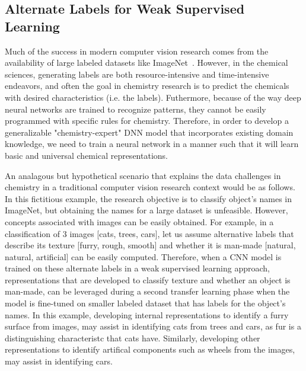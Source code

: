 \documentclass[sigconf]{acmart}
\begin{document}
\subsection{Alternate Labels for Weak Supervised Learning}
Much of the success in modern computer vision research comes from the availability of large labeled datasets like ImageNet~\cite{russakovsky2015}. However, in the chemical sciences, generating labels are both resource-intensive and time-intensive endeavors, and often the goal in chemistry research is to predict the chemicals with desired characteristics (i.e. the labels). Futhermore, because of the way deep neural networks are trained to recognize patterns, they cannot be easily programmed with specific rules for chemistry. Therefore, in order to develop a generalizable "chemistry-expert" DNN model that incorporates existing domain knowledge, we need to train a neural network in a manner such that it will learn basic and universal chemical representations. 

An analagous but hypothetical scenario that explains the data challenges in chemistry in a traditional computer vision research context would be as follows. In this fictitious example, the research objective is to classify object's names in ImageNet, but obtaining the names for a large dataset is unfeasible. However, concepts associated with images can be easily obtained. For example, in a classification of 3 images [cats, trees, cars], let us assume alternative labels that describe its texture [furry, rough, smooth] and whether it is man-made [natural, natural, artificial] can be easily computed. Therefore, when a CNN model is trained on these alternate labels in a weak supervised learning approach, representations that are developed to classify texture and whether an object is man-made, can be leveraged during a second transfer learning phase when the model is fine-tuned on smaller labeled dataset that has labels for the object's names. In this example, developing internal representations to identify a furry surface from images, may assist in identifying cats from trees and cars, as fur is a distinguishing characteristc that cats have. Similarly, developing other representations to identify artifical components such as wheels from the images, may assist in identifying cars. 
\end{document}
